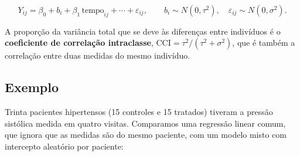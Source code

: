 \documentclass[
]{book}
\begin{document}
\[
Y_{ij} = \beta_0 + b_i + \beta_1 \,\text{tempo}_{ij} + \cdots + \varepsilon_{ij}, \qquad b_i \sim N(0, \tau^2), \quad \varepsilon_{ij} \sim N(0, \sigma^2).
\]

A proporção da variância total que se deve às diferenças entre indivíduos é o \textbf{coeficiente de correlação intraclasse}, \(\text{CCI} = \tau^2/(\tau^2 + \sigma^2)\), que é também a correlação entre duas medidas do mesmo indivíduo.

\subsection{Exemplo}\label{exemplo}

Trinta pacientes hipertensos (15 controles e 15 tratados) tiveram a pressão sistólica medida em quatro visitas. Comparamos uma regressão linear comum, que ignora que as medidas são do mesmo paciente, com um modelo misto com intercepto aleatório por paciente:
\end{document}
